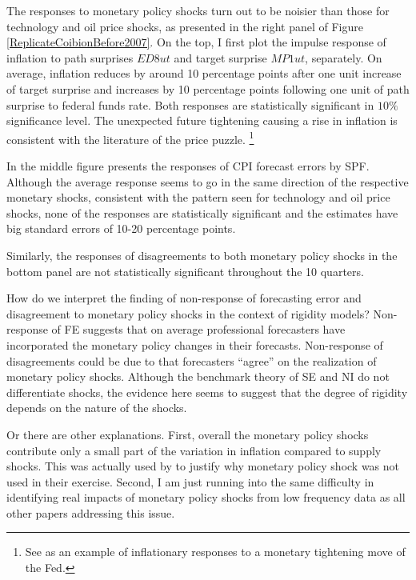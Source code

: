 \documentclass[12pt]{article}
\begin{document}
	The responses to monetary policy shocks turn out to be noisier than those for technology and oil price shocks, as presented in the right panel of Figure \ref{ReplicateCoibionBefore2007}. On the top, I first plot the impulse response of inflation to path surprises $ED8ut$ and target surprise $MP1ut$, separately. On average, inflation reduces by around 10 percentage points after one unit increase of target surprise and increases by 10 percentage points following one unit of path surprise to federal funds rate. Both responses are  statistically significant in $10\%$  significance level. The unexpected future tightening causing a rise in inflation is consistent with the literature of the price puzzle. \footnote{See \cite{nakamura2018high} as an example of inflationary responses to a monetary tightening move of the Fed.}
	
	In the middle figure presents the responses of CPI forecast errors by SPF.  Although the average response seems to go in the same direction of the respective monetary shocks, consistent with the pattern seen for technology and oil price shocks, none of the responses are statistically significant and the estimates have big standard errors of 10-20 percentage points.  
	
	Similarly, the responses of disagreements to both monetary policy shocks in the bottom panel are not statistically significant throughout the 10 quarters.  
	
	How do we interpret the finding of non-response of forecasting error and disagreement to monetary policy shocks in the context of rigidity models? Non-response of FE suggests that on average professional forecasters have incorporated the monetary policy changes in their forecasts. Non-response of disagreements could be due to that forecasters ``agree'' on the realization of monetary policy shocks. Although the benchmark theory of SE and NI do not differentiate shocks, the evidence here seems to suggest that the degree of rigidity depends on the nature of the shocks. 
	
	Or there are other explanations.  First, overall the monetary policy shocks contribute only a small part of the variation in inflation compared to supply shocks. This was actually used by \cite{coibion2012can} to justify why monetary policy shock was not used in their exercise.  Second,  I am just running into the same difficulty in identifying real impacts of monetary policy shocks from low frequency data as all other papers addressing this issue. 
	
\end{document}
